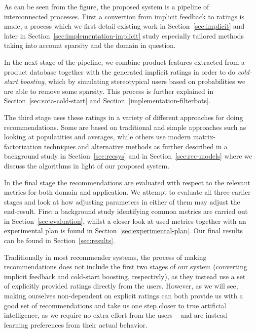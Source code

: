 As can be seen from the figure, the proposed system is a pipeline of
interconnected processes. First a convertion from implicit feedback to ratings
is made, a process which we first detail existing work in
Section~\ref{sec:implicit} and later in
Section~\ref{sec:implementation-implicit} study especially tailored methods
taking into account sparsity and the domain in question.

In the next stage of the pipeline, we combine product features extracted from a
product database together with the generated implicit ratings in order to do
\textit{cold-start boosting}, which by simulating stereotypical users based on
probabilities we are able to remove some sparsity. This process is further
explained in Section~\ref{sec:sota-cold-start} and
Section~\ref{implementation-filterbots}.

The third stage uses these ratings in a variety of different approaches for
doing recommendations. Some are based on traditional and simple approaches such
as looking at populatities and averages, while others use modern
matrix-factorization techniques and alternative methods as further described in
a background study in Section~\ref{sec:recsys} and in
Section~\ref{sec:rec-models} where we discuss the algorithms in light of our
proposed system.

In the final stage the recommendations are evaluated with respect to the
relevant metrics for both domain and application. We attempt to evaluate all
three earlier stages and look at how adjusting parameters in either of them may
adjust the end-result. First a background study identifying common metrics are
carried out in Section~\ref{sec:evaluation}, whilst a closer look at used
metrics together with an experimental plan is found in
Section~\ref{sec:experimental-plan}. Our final results can be found in
Section~\ref{sec:results}.

Traditionally in most recommender systems, the process of making
recommendations does not include the first two stages of our system (converting
implicit feedback and cold-start boosting, respectivly), as they instead use a
set of explicitly provided ratings directly from the users. However, as we will
see, making ourselves non-dependent on explicit ratings can both provide us
with a good set of recommendations and take us one step closer to true
artificial intelligence, as we require no extra effort from the users -- and are
instead learning preferences from their actual behavior.

